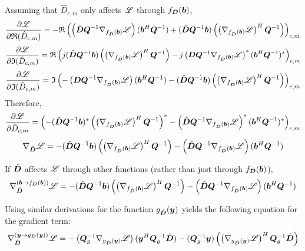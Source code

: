 \begin{appendices}
Assuming that $\hat{D}_{c,m}$ only affects $\mathscr{L}$ through $f_{\bm{D}}(\bm{b})$,
\begin{equation}
\frac{\partial \mathscr{L}}{\partial \mathfrak{R}(\hat{D}_{c,m})} = -\mathfrak{R}\left(\left(\hat{\bm{D}}\bm{Q}^{-1}\nabla_{f_{\hat{\bm{D}}}(\bm{b})} \mathscr{L}\right) (\bm{b}^H\bm{Q}^{-1}) + (\hat{\bm{D}}\bm{Q}^{-1}\bm{b})\left(\left(\nabla_{f_{\hat{\bm{D}}}(\bm{b})} \mathscr{L}\right)^H\bm{Q}^{-1}\right)\right)_{c,m}
\end{equation}
\begin{equation}
\frac{\partial \mathscr{L}}{\partial \mathfrak{I}(\hat{D}_{c,m})} = \mathfrak{R}\left(j(\hat{\bm{D}}\bm{Q}^{-1}\bm{b})\left(\left(\nabla_{f_{\hat{\bm{D}}}(\bm{b})} \mathscr{L}\right)^H\bm{Q}^{-1}\right) - j\left(\bm{D}\bm{Q}^{-1}\nabla_{f_{\hat{\bm{D}}}(\bm{b})} \mathscr{L}\right)^*(\bm{b}^H\bm{Q}^{-1})^*\right)_{c,m}
\end{equation}
\begin{equation}
\frac{\partial \mathscr{L}}{\partial \mathfrak{I}(\hat{D}_{c,m})} = \mathfrak{I}\left(-\left(\bm{D}\bm{Q}^{-1}\nabla_{f_{\hat{\bm{D}}}(\bm{b})} \mathscr{L}\right)(\bm{b}^H\bm{Q}^{-1}) - (\hat{\bm{D}}\bm{Q}^{-1}\bm{b})\left(\left(\nabla_{f_{\hat{\bm{D}}}(\bm{b})} \mathscr{L}\right)^H\bm{Q}^{-1}\right)\right)_{c,m}
\end{equation}
Therefore,
\begin{equation}
\frac{\partial \mathscr{L}}{\partial \hat{D}_{c,m}} = \left(-(\hat{\bm{D}}\bm{Q}^{-1}\bm{b})^*\left(\left(\nabla_{f_{\hat{\bm{D}}}(\bm{b})} \mathscr{L}\right)^H\bm{Q}^{-1}\right)^* - \left(\hat{\bm{D}}\bm{Q}^{-1}\nabla_{f_{\hat{\bm{D}}}(\bm{b})} \mathscr{L}\right)^* (\bm{b}^H\bm{Q}^{-1})^*\right)_{c,m}
\end{equation}
\begin{equation}
\nabla_{\hat{\bm{D}}} \mathscr{L} = -(\hat{\bm{D}}\bm{Q}^{-1}\bm{b})\left(\left(\nabla_{f_{\hat{\bm{D}}}(\bm{b})} \mathscr{L}\right)^H\bm{Q}^{-1}\right) - \left(\hat{\bm{D}}\bm{Q}^{-1}\nabla_{f_{\hat{\bm{D}}}(\bm{b})} \mathscr{L}\right) (\bm{b}^H\bm{Q}^{-1})
\end{equation}

If $\hat{\bm{D}}$ affects $\mathscr{L}$ through other functions (rather than just through $f_{\bm{D}}(\bm{b})$),
\begin{equation}
\nabla^{(\bm{b} \rightarrow f_{\bm{D}}(\bm{b}))}_{\hat{\bm{D}}} \mathscr{L} = -(\hat{\bm{D}}\bm{Q}^{-1}\bm{b})\left(\left(\nabla_{f_{\hat{\bm{D}}}(\bm{b})} \mathscr{L}\right)^H\bm{Q}^{-1}\right) - \left(\hat{\bm{D}}\bm{Q}^{-1}\nabla_{f_{\hat{\bm{D}}}(\bm{b})} \mathscr{L}\right) (\bm{b}^H\bm{Q}^{-1})
\end{equation}


Using similar derivations for the function $g_{\hat{\bm{D}}}(\bm{y})$ yields the following equation for the gradient term:
\begin{equation}
\nabla^{(\bm{y} \rightarrow g_{\bm{D}}(\bm{y}))}_{\hat{\bm{D}}} \mathscr{L} = -\left(\bm{Q}_g^{-1}\nabla_{g_{\hat{\bm{D}}}(\bm{y})} \mathscr{L}\right)(\bm{y}^H\bm{Q}_g^{-1}\hat{\bm{D}}) - (\bm{Q}_g^{-1}\bm{y})\left(\left(\nabla_{g_{\hat{\bm{D}}}(\bm{y})} \mathscr{L}\right)^H\bm{Q}_g^{-1}\hat{\bm{D}}\right)
\end{equation}



\end{appendices}
